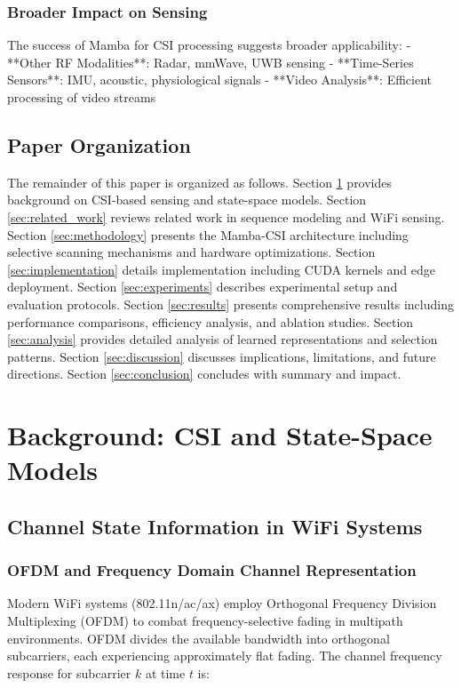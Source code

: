 \documentclass[10pt,journal,compsoc]{IEEEtran}
\begin{document}
\subsubsection{Broader Impact on Sensing}
The success of Mamba for CSI processing suggests broader applicability:
- **Other RF Modalities**: Radar, mmWave, UWB sensing
- **Time-Series Sensors**: IMU, acoustic, physiological signals
- **Video Analysis**: Efficient processing of video streams

\subsection{Paper Organization}

The remainder of this paper is organized as follows. Section \ref{sec:background} provides background on CSI-based sensing and state-space models. Section \ref{sec:related_work} reviews related work in sequence modeling and WiFi sensing. Section \ref{sec:methodology} presents the Mamba-CSI architecture including selective scanning mechanisms and hardware optimizations. Section \ref{sec:implementation} details implementation including CUDA kernels and edge deployment. Section \ref{sec:experiments} describes experimental setup and evaluation protocols. Section \ref{sec:results} presents comprehensive results including performance comparisons, efficiency analysis, and ablation studies. Section \ref{sec:analysis} provides detailed analysis of learned representations and selection patterns. Section \ref{sec:discussion} discusses implications, limitations, and future directions. Section \ref{sec:conclusion} concludes with summary and impact.

\section{Background: CSI and State-Space Models}
\label{sec:background}

\subsection{Channel State Information in WiFi Systems}

\subsubsection{OFDM and Frequency Domain Channel Representation}

Modern WiFi systems (802.11n/ac/ax) employ Orthogonal Frequency Division Multiplexing (OFDM) to combat frequency-selective fading in multipath environments. OFDM divides the available bandwidth into orthogonal subcarriers, each experiencing approximately flat fading. The channel frequency response for subcarrier $k$ at time $t$ is:
\end{document}
